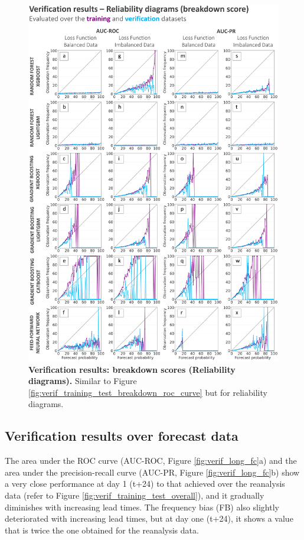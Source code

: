 \documentclass[nhess, manuscript]{copernicus}
\begin{document}
\begin{figure}[t]
\includegraphics[width=12cm]{figures/verif_training_test_breakdown_reliability_diagram.png}
\caption{\textbf{Verification results: breakdown scores (Reliability diagrams).} Similar to Figure \ref{fig:verif_training_test_breakdown_roc_curve} but for reliability diagrams.}
\label{fig:verif_training_test_breakdown_reliability_diagram}
\end{figure}


\subsection{Verification results over forecast data}

The area under the ROC curve (AUC-ROC, Figure \ref{fig:verif_long_fc}a) and the area under the precision-recall curve (AUC-PR, Figure \ref{fig:verif_long_fc}b) show a very close performance at day 1 (t+24) to that achieved over the reanalysis data (refer to Figure \ref{fig:verif_training_test_overall}), and it gradually diminishes with increasing lead times. The frequency bias (FB) also slightly deteriorated with increasing lead times, but at day one (t+24), it shows a value that is twice the one obtained for the reanalysis data. 
\end{document}
